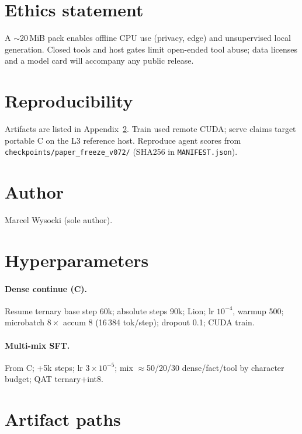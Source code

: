 \documentclass[11pt,a4paper]{article}
\begin{document}
\section*{Ethics statement}
A $\sim$20\,MiB pack enables offline CPU use (privacy, edge) and unsupervised local generation.
Closed tools and host gates limit open-ended tool abuse; data licenses and a model card will accompany any public release.

\section*{Reproducibility}
Artifacts are listed in Appendix~\ref{app:artifacts}.
Train used remote CUDA; serve claims target portable C on the L3 reference host.
Reproduce agent scores from \texttt{checkpoints/paper\_freeze\_v072/} (SHA256 in \texttt{MANIFEST.json}).

\section*{Author}
Marcel Wysocki (sole author).

\appendix
\section{Hyperparameters}
\label{app:hp}

\paragraph{Dense continue (C).}
Resume ternary base step 60k; absolute steps 90k; Lion; lr $10^{-4}$, warmup 500; microbatch $8\times$ accum 8 (16\,384 tok/step); dropout 0.1; CUDA train.

\paragraph{Multi-mix SFT.}
From C; +5k steps; lr $3{\times}10^{-5}$; mix $\approx$50/20/30 dense/fact/tool by character budget; QAT ternary+int8.

\section{Artifact paths}
\label{app:artifacts}
\end{document}
